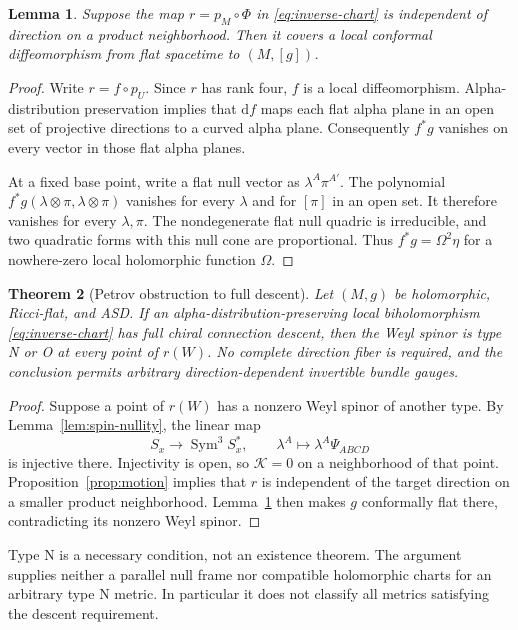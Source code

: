 \documentclass[11pt]{article}
\numberwithin{equation}{section}
\newtheorem{theorem}{Theorem}[section]
\newtheorem{lemma}[theorem]{Lemma}
\theoremstyle{definition}
\theoremstyle{remark}
\newcommand{\dd}{\mathrm d}
\newcommand{\calK}{\mathcal K}
\begin{document}
\begin{lemma}\label{lem:conformal}
Suppose the map $r=p_M\circ\Phi$ in \eqref{eq:inverse-chart} is independent of direction on a product neighborhood. Then it covers a local conformal diffeomorphism from flat spacetime to $(M,[g])$.
\end{lemma}
\begin{proof}
Write $r=f\circ p_U$. Since $r$ has rank four, $f$ is a local diffeomorphism. Alpha-distribution preservation implies that $\dd f$ maps each flat alpha plane in an open set of projective directions to a curved alpha plane. Consequently $f^*g$ vanishes on every vector in those flat alpha planes.

At a fixed base point, write a flat null vector as $\lambda^A\pi^{A'}$. The polynomial $f^*g(\lambda\otimes\pi,\lambda\otimes\pi)$ vanishes for every $\lambda$ and for $[\pi]$ in an open set. It therefore vanishes for every $\lambda,\pi$. The nondegenerate flat null quadric is irreducible, and two quadratic forms with this null cone are proportional. Thus $f^*g=\Omega^2\eta$ for a nowhere-zero local holomorphic function $\Omega$.
\end{proof}

\begin{theorem}[Petrov obstruction to full descent]\label{thm:petrov}
Let $(M,g)$ be holomorphic, Ricci-flat, and ASD. If an alpha-distribution-preserving local biholomorphism \eqref{eq:inverse-chart} has full chiral connection descent, then the Weyl spinor is type N or O at every point of $r(W)$. No complete direction fiber is required, and the conclusion permits arbitrary direction-dependent invertible bundle gauges.
\end{theorem}
\begin{proof}
Suppose a point of $r(W)$ has a nonzero Weyl spinor of another type. By Lemma~\ref{lem:spin-nullity}, the linear map
\[
S_x\longrightarrow\operatorname{Sym}^3S_x^*,
\qquad \lambda^A\longmapsto\lambda^A\Psi_{ABCD}
\]
is injective there. Injectivity is open, so $\calK=0$ on a neighborhood of that point. Proposition~\ref{prop:motion} implies that $r$ is independent of the target direction on a smaller product neighborhood. Lemma~\ref{lem:conformal} then makes $g$ conformally flat there, contradicting its nonzero Weyl spinor.
\end{proof}

Type N is a necessary condition, not an existence theorem. The argument supplies neither a parallel null frame nor compatible holomorphic charts for an arbitrary type N metric. In particular it does not classify all metrics satisfying the descent requirement.
\end{document}
